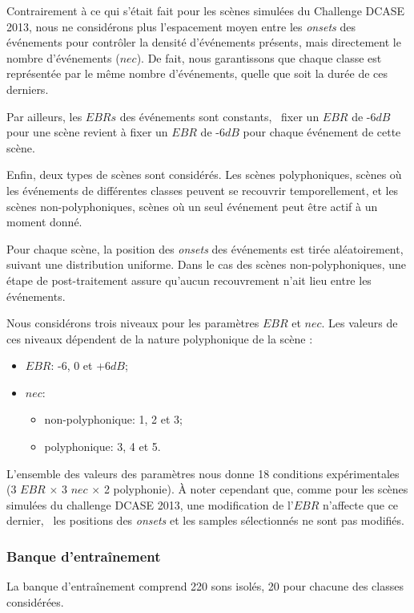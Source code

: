 Contrairement à ce qui s'était fait pour les scènes simulées du Challenge DCASE 2013, nous ne considérons plus l'espacement moyen entre les \emph{onsets} des événements pour contrôler la densité d'événements présents, mais directement le nombre d'événements ($nec$). De fait, nous garantissons que chaque classe est représentée par le même nombre d'événements, quelle que soit la durée de ces derniers.

Par ailleurs, les $EBRs$ des événements sont constants, \ie~fixer un $EBR$ de -6$dB$ pour une scène revient à fixer un $EBR$ de -6$dB$ pour chaque événement de cette scène.

Enfin, deux types de scènes sont considérés. Les scènes polyphoniques, scènes où les événements de différentes classes peuvent se recouvrir temporellement, et les scènes non-polyphoniques, scènes où un seul événement peut être actif à un moment donné.

Pour chaque scène, la position des \emph{onsets} des événements est tirée aléatoirement, suivant une distribution uniforme. Dans le cas des scènes non-polyphoniques, une étape de post-traitement assure qu'aucun recouvrement n'ait lieu entre les événements.

Nous considérons trois niveaux pour les paramètres $EBR$ et $nec$. Les valeurs de ces niveaux dépendent de la nature polyphonique de la scène :

\begin{itemize}
\item $EBR$: -6, 0 et +6$dB$;
\item $nec$: 
\begin{itemize}
\item non-polyphonique: 1, 2 et 3;
\item polyphonique: 3, 4 et 5.
\end{itemize}
\end{itemize}

L'ensemble des valeurs des paramètres nous donne 18 conditions expérimentales (3 $EBR$ $\times$ 3 $nec$ $\times$ 2 polyphonie). À noter cependant que, comme pour les scènes simulées du challenge DCASE 2013, une modification de l'$EBR$ n'affecte que ce dernier, \ie~les positions des \emph{onsets} et les samples sélectionnés ne sont pas modifiés.

\subsubsection{Banque d'entraînement}

La banque d’entraînement comprend 220 sons isolés, 20 pour chacune des classes considérées.

